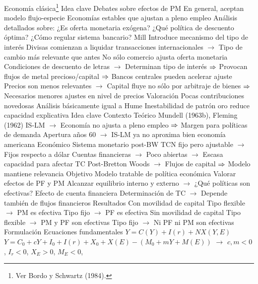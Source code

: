 \documentclass{nuevotema}
\begin{document}
\begin{esquemal}
		\2 Economía clásica\footnote{Ver Bordo y Schwartz (1984).}
			\3 Idea clave
				\4 Debates sobre efectos de PM
				\4 En general, aceptan modelo flujo-especie
				\4 Economías estables que ajustan a pleno empleo
				\4 Análisis detallados sobre:
				\4[] ¿Es oferta monetaria exógena?
				\4[] ¿Qué política de descuento óptima?
				\4[] ¿Cómo regular sistema bancario?
			\3 Mill
				\4 Introduce mecanismo del tipo de interés
				\4[] Divisas comienzan a liquidar transacciones internacionales
				\4[] $\to$ Tipo de cambio más relevante que antes
				\4 No sólo comercio ajusta oferta monetaria
				\4[] Condiciones de descuento de letras
				\4[] $\to$ Determinan tipo de interés
				\4[] $\Rightarrow$ Provocan flujos de metal precioso/capital
				\4[] $\Rightarrow$ Bancos centrales pueden acelerar ajuste
				\4[] Precios son menos relevantes
				\4[] $\to$ Capital fluye no sólo por arbitraje de bienes
				\4[] $\Rightarrow$ Necesarios menores ajustes en nivel de precios
			\3 Valoración
				\4 Pocas contribuciones novedosas
				\4 Análisis básicamente igual a Hume
				\4 Inestabilidad de patrón oro reduce capacidad explicativa
	\1 
		\2 Idea clave
			\3 Contexto
				\4 Teórico
				\4[] Mundell (1963b), Fleming (1962)
				\4[] IS-LM
				\4[] $\to$ Economía no ajusta a pleno empleo
				\4[] $\Rightarrow$ Margen para políticas de demanda
				\4[] Apertura años 60
				\4[] $\to$ IS-LM ya no aproxima bien economía americana
				\4 Económico
				\4[] Sistema monetario post-BW
				\4[] TCN fijo pero ajustable
				\4[] $\to$ Fijos respecto a dólar
				\4[] Cuentas financieras
				\4[] $\to$ Poco abiertas
				\4[] $\to$ Escasa capacidad para afectar TC
				\4[] Post-Bretton Woods
				\4[] $\to$ Flujos de capital
				\4[] $\Rightarrow$ Modelo mantiene relevancia
			\3 Objetivo
				\4 Modelo tratable de política económica
				\4[] Valorar efectos de PF y PM
				\4[] Alcanzar equilibrio interno y externo
				\4[] $\to$ ¿Qué políticas son efectivas?
				\4 Efecto de cuenta financiera
				\4[] Determinación de TC
				\4[] $\to$ Depende también de flujos financieros
			\3 Resultados
				\4 Con movilidad de capital
				\4[] Tipo flexible
				\4[] $\to$ PM es efectiva
				\4[] Tipo fijo
				\4[] $\to$ PF es efectiva
				\4 Sin movilidad de capital
				\4[] Tipo flexible
				\4[] $\to$ PM y PF son efectivas
				\4[] Tipo fijo
				\4[] $\to$ Ni PF ni PM son efectivas
		\2 Formulación
			\3 Ecuaciones fundamentales
				\4[IS] $Y = C(Y) + I(r) + NX(Y,E)$
				\4[] $Y = C_0 + c Y + I_0 + I(r) + X_0 + X(E) - (M_0 + m Y + M(E))$
				\4[] $\to$ $c,m < 0$, $I_r < 0$, $X_E > 0$, $M_E < 0$,

\end{esquemal}
\end{document}
